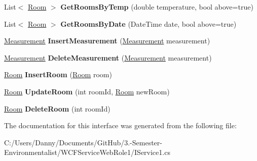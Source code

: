 \begin{DoxyCompactItemize}
\item 
\hypertarget{interface_w_c_f_service_web_role1_1_1_i_service1_aceea31eb37174848da60e96ff5e30dad}{}List$<$ \hyperlink{class_w_c_f_service_web_role1_1_1_room}{Room} $>$ {\bfseries Get\+Rooms\+By\+Temp} (double temperature, bool above=true)\label{interface_w_c_f_service_web_role1_1_1_i_service1_aceea31eb37174848da60e96ff5e30dad}

\item 
\hypertarget{interface_w_c_f_service_web_role1_1_1_i_service1_a16c69dc1cffb79158a160888bdeea8af}{}List$<$ \hyperlink{class_w_c_f_service_web_role1_1_1_room}{Room} $>$ {\bfseries Get\+Rooms\+By\+Date} (Date\+Time date, bool above=true)\label{interface_w_c_f_service_web_role1_1_1_i_service1_a16c69dc1cffb79158a160888bdeea8af}

\item 
\hypertarget{interface_w_c_f_service_web_role1_1_1_i_service1_ac8257abf679c212854debc3dfd2d1bf0}{}\hyperlink{class_w_c_f_service_web_role1_1_1_measurement}{Measurement} {\bfseries Insert\+Measurement} (\hyperlink{class_w_c_f_service_web_role1_1_1_measurement}{Measurement} measurement)\label{interface_w_c_f_service_web_role1_1_1_i_service1_ac8257abf679c212854debc3dfd2d1bf0}

\item 
\hypertarget{interface_w_c_f_service_web_role1_1_1_i_service1_aaa639c48573356f49aae7c6260b91eca}{}\hyperlink{class_w_c_f_service_web_role1_1_1_measurement}{Measurement} {\bfseries Delete\+Measurement} (\hyperlink{class_w_c_f_service_web_role1_1_1_measurement}{Measurement} measurement)\label{interface_w_c_f_service_web_role1_1_1_i_service1_aaa639c48573356f49aae7c6260b91eca}

\item 
\hypertarget{interface_w_c_f_service_web_role1_1_1_i_service1_a7398a7af401e117fd968f55ff0885642}{}\hyperlink{class_w_c_f_service_web_role1_1_1_room}{Room} {\bfseries Insert\+Room} (\hyperlink{class_w_c_f_service_web_role1_1_1_room}{Room} room)\label{interface_w_c_f_service_web_role1_1_1_i_service1_a7398a7af401e117fd968f55ff0885642}

\item 
\hypertarget{interface_w_c_f_service_web_role1_1_1_i_service1_abab37e67560089b43240544d04c4f1c3}{}\hyperlink{class_w_c_f_service_web_role1_1_1_room}{Room} {\bfseries Update\+Room} (int room\+Id, \hyperlink{class_w_c_f_service_web_role1_1_1_room}{Room} new\+Room)\label{interface_w_c_f_service_web_role1_1_1_i_service1_abab37e67560089b43240544d04c4f1c3}

\item 
\hypertarget{interface_w_c_f_service_web_role1_1_1_i_service1_a69a8714ed93d83d0bf623a118822d5f5}{}\hyperlink{class_w_c_f_service_web_role1_1_1_room}{Room} {\bfseries Delete\+Room} (int room\+Id)\label{interface_w_c_f_service_web_role1_1_1_i_service1_a69a8714ed93d83d0bf623a118822d5f5}

\end{DoxyCompactItemize}


The documentation for this interface was generated from the following file\+:\begin{DoxyCompactItemize}
\item 
C\+:/\+Users/\+Danny/\+Documents/\+Git\+Hub/3.-\/\+Semester-\/\+Environmentalist/\+W\+C\+F\+Service\+Web\+Role1/I\+Service1.\+cs\end{DoxyCompactItemize}
